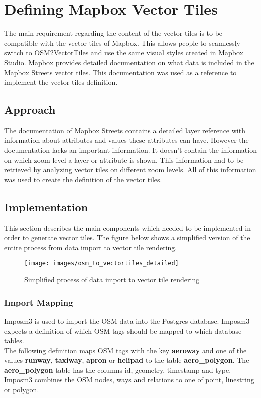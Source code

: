 \chapter{Defining Mapbox Vector Tiles}

The main requirement regarding the content of the vector tiles is to be compatible with the vector tiles of Mapbox. This allows people to seamlessly switch to OSM2VectorTiles and use the same visual styles created in Mapbox Studio. Mapbox provides detailed documentation on what data is included in the Mapbox Streets vector tiles. This documentation was used as a reference to implement the vector tiles definition.

\section{Approach}

The documentation of Mapbox Streets contains a detailed layer reference with information about attributes and values these attributes can have. However the documentation lacks an important information. It doesn't contain the information on which zoom level a layer or attribute is shown. This information had to be retrieved by analyzing vector tiles on different zoom levels. All of this information was used to create the definition of the vector tiles.

\section{Implementation}
This section describes the main components which needed to be implemented in order to generate vector tiles. The figure below shows a simplified version of the entire process from data import to vector tile rendering. 

\begin{figure}[H]
\centering
\texttt{[image: images/osm\_to\_vectortiles\_detailed]}
\caption{Simplified process of data import to vector tile rendering}
\end{figure}


\subsection{Import Mapping}

Imposm3 is used to import the OSM data into the Postgres database. Imposm3 expects a definition of which OSM tags should be mapped to which database tables.\\
The following definition maps OSM tags with the key \textbf{aeroway} and one of the values \textbf{runway}, \textbf{taxiway}, \textbf{apron} or \textbf{helipad} to the table \textbf{aero\_polygon}. The \textbf{aero\_polygon} table has the columns id, geometry, timestamp and type. Imposm3 combines the OSM nodes, ways and relations to one of point, linestring or polygon.

